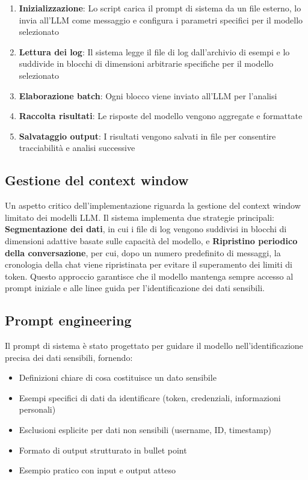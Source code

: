 \documentclass[12pt]{report}
\begin{document}
\begin{enumerate}
    \item \textbf{Inizializzazione}: Lo script carica il prompt di sistema da un file esterno, lo invia all'LLM come messaggio e configura i parametri specifici per il modello selezionato
    \item \textbf{Lettura dei log}: Il sistema legge il file di log dall'archivio di esempi e lo suddivide in blocchi di dimensioni arbitrarie specifiche per il modello selezionato
    \item \textbf{Elaborazione batch}: Ogni blocco viene inviato all'LLM per l'analisi
    \item \textbf{Raccolta risultati}: Le risposte del modello vengono aggregate e formattate
    \item \textbf{Salvataggio output}: I risultati vengono salvati in file per consentire tracciabilità e analisi successive
\end{enumerate}

\subsection{Gestione del context window}
\label{subsec:ver1_context_window}

Un aspetto critico dell'implementazione riguarda la gestione del context window limitato dei modelli LLM. Il sistema implementa due strategie principali: \textbf{Segmentazione dei dati}, in cui i file di log vengono suddivisi in blocchi di dimensioni adattive basate sulle capacità del modello, e \textbf{Ripristino periodico della conversazione}, per cui, dopo un numero predefinito di messaggi, la cronologia della chat viene ripristinata per evitare il superamento dei limiti di token. Questo approccio garantisce che il modello mantenga sempre accesso al prompt iniziale e alle linee guida per l'identificazione dei dati sensibili.

\subsection{Prompt engineering}
\label{subsec:ver1_prompt_engineering}

Il prompt di sistema è stato progettato per guidare il modello nell'identificazione precisa dei dati sensibili, fornendo:

\begin{itemize}
    \item Definizioni chiare di cosa costituisce un dato sensibile
    \item Esempi specifici di dati da identificare (token, credenziali, informazioni personali)
    \item Esclusioni esplicite per dati non sensibili (username, ID, timestamp)
    \item Formato di output strutturato in bullet point
    \item Esempio pratico con input e output atteso
\end{itemize}
\end{document}

